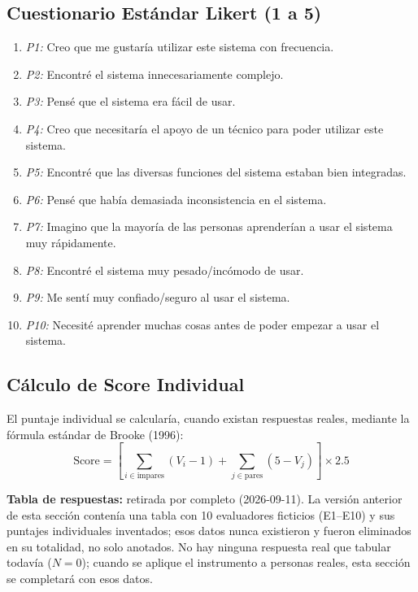 \documentclass[10pt,a4paper]{article}
\begin{document}
\subsection{Cuestionario Estándar Likert (1 a 5)}
\begin{enumerate}
    \item \textit{P1:} Creo que me gustaría utilizar este sistema con frecuencia.
    \item \textit{P2:} Encontré el sistema innecesariamente complejo.
    \item \textit{P3:} Pensé que el sistema era fácil de usar.
    \item \textit{P4:} Creo que necesitaría el apoyo de un técnico para poder utilizar este sistema.
    \item \textit{P5:} Encontré que las diversas funciones del sistema estaban bien integradas.
    \item \textit{P6:} Pensé que había demasiada inconsistencia en el sistema.
    \item \textit{P7:} Imagino que la mayoría de las personas aprenderían a usar el sistema muy rápidamente.
    \item \textit{P8:} Encontré el sistema muy pesado/incómodo de usar.
    \item \textit{P9:} Me sentí muy confiado/seguro al usar el sistema.
    \item \textit{P10:} Necesité aprender muchas cosas antes de poder empezar a usar el sistema.
\end{enumerate}

\subsection{Cálculo de Score Individual}

El puntaje individual se calcularía, cuando existan respuestas reales, mediante la fórmula estándar de Brooke (1996):
\begin{equation}
\text{Score} = \left[ \sum_{i \in \text{impares}} (V_i - 1) + \sum_{j \in \text{pares}} (5 - V_j) \right] \times 2.5
\end{equation}

\vspace{0.2cm}
\noindent \textbf{Tabla de respuestas:} retirada por completo (2026-09-11). La versión anterior de esta sección contenía una tabla con 10 evaluadores ficticios (E1--E10) y sus puntajes individuales inventados; esos datos nunca existieron y fueron eliminados en su totalidad, no solo anotados. No hay ninguna respuesta real que tabular todavía ($N=0$); cuando se aplique el instrumento a personas reales, esta sección se completará con esos datos.
\end{document}
